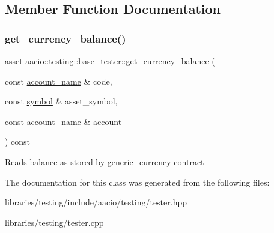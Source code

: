 \subsection{Member Function Documentation}
\mbox{\label{classaacio_1_1testing_1_1base__tester_a770b193268f4759839daef090e81fb02}} 
\subsubsection{\texorpdfstring{get\+\_\+currency\+\_\+balance()}{get\_currency\_balance()}}
{\footnotesize\ttfamily \mbox{\hyperlink{structaacio_1_1asset}{asset}} aacio\+::testing\+::base\+\_\+tester\+::get\+\_\+currency\+\_\+balance (\begin{DoxyParamCaption}\item[{const \mbox{\hyperlink{structaacio_1_1chain_1_1name}{account\+\_\+name}} \&}]{code,  }\item[{const \mbox{\hyperlink{classaacio_1_1chain_1_1symbol}{symbol}} \&}]{asset\+\_\+symbol,  }\item[{const \mbox{\hyperlink{structaacio_1_1chain_1_1name}{account\+\_\+name}} \&}]{account }\end{DoxyParamCaption}) const}

Reads balance as stored by \mbox{\hyperlink{classaacio_1_1generic__currency}{generic\+\_\+currency}} contract 

The documentation for this class was generated from the following files\+:\begin{DoxyCompactItemize}
\item 
libraries/testing/include/aacio/testing/tester.\+hpp\item 
libraries/testing/tester.\+cpp\end{DoxyCompactItemize}

